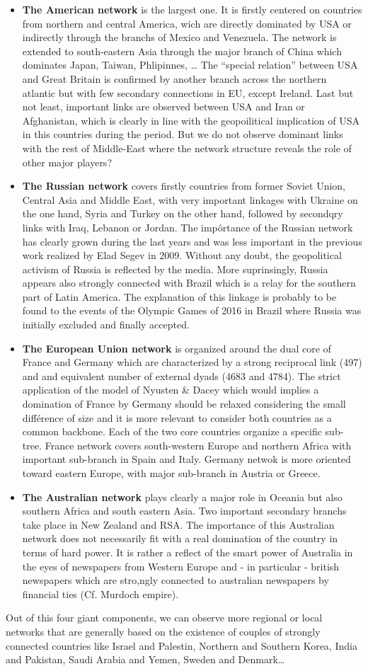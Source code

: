\documentclass[
]{article}
\begin{document}
\begin{itemize}
\item
  \textbf{The American network} is the largest one. It is firstly
  centered on countries from northern and central America, wich are
  directly dominated by USA or indirectly through the branchs of Mexico
  and Venezuela. The network is extended to south-eastern Asia through
  the major branch of China which dominates Japan, Taiwan, Phlipinnes,
  \ldots{} The ``special relation'' between USA and Great Britain is
  confirmed by another branch across the northern atlantic but with few
  secondary connections in EU, except Ireland. Last but not least,
  important links are observed between USA and Iran or Afghanistan,
  which is clearly in line with the geopoilitical implication of USA in
  this countries during the period. But we do not observe dominant links
  with the rest of Middle-East where the network structure reveals the
  role of other major players?
\item
  \textbf{The Russian network} covers firstly countries from former
  Soviet Union, Central Asia and Middle East, with very important
  linkages with Ukraine on the one hand, Syria and Turkey on the other
  hand, followed by secondqry links with Iraq, Lebanon or Jordan. The
  impôrtance of the Russian network has clearly grown during the last
  years and was less important in the previous work realized by Elad
  Segev in 2009. Without any doubt, the geopolitical activism of Russia
  is reflected by the media. More suprinsingly, Russia appears also
  strongly connected with Brazil which is a relay for the southern part
  of Latin America. The explanation of this linkage is probably to be
  found to the events of the Olympic Games of 2016 in Brazil where
  Russia was initially excluded and finally accepted.
\item
  \textbf{The European Union network} is organized around the dual core
  of France and Germany which are characterized by a strong reciprocal
  link (497) and and equivalent number of external dyads (4683 and
  4784). The strict application of the model of Nyusten \& Dacey which
  would implies a domination of France by Germany should be relaxed
  considering the small différence of size and it is more relevant to
  consider both countries as a common backbone. Each of the two core
  countries organize a specific sub-tree. France network covers
  south-western Europe and northern Africa with important sub-branch in
  Spain and Italy. Germany netwok is more oriented toward eastern
  Europe, with major sub-branch in Austria or Greece.
\item
  \textbf{The Australian network} plays clearly a major role in Oceania
  but also southern Africa and south eastern Asia. Two important
  secondary branchs take place in New Zealand and RSA. The importance of
  this Australian network does not necessarily fit with a real
  domination of the country in terms of hard power. It is rather a
  reflect of the smart power of Australia in the eyes of newspapers from
  Western Europe and - in particular - british newspapers which are
  stro,ngly connected to australian newspapers by financial ties (Cf.
  Murdoch empire).
\end{itemize}

Out of this four giant components, we can observe more regional or local
networks that are generally based on the existence of couples of
strongly connected countries like Israel and Palestin, Northern and
Southern Korea, India and Pakistan, Saudi Arabia and Yemen, Sweden and
Denmark\ldots{}
\end{document}
